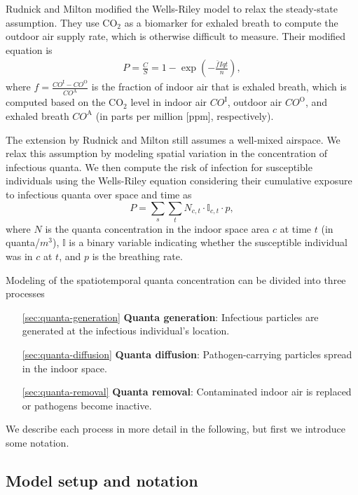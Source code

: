 \documentclass[fleqn,11pt]{wlscirep_supp}
\begin{document}
Rudnick and Milton\cite{Rudnick2003IndoorAir} modified the Wells-Riley model to relax the steady-state assumption. They use CO$_2$ as a biomarker for exhaled breath to compute the outdoor air supply rate, which is otherwise difficult to measure. Their modified equation is
\begin{align}
    P = \frac{C}{S} = 1 - \exp \left(-\frac{\bar{f}Iqt}{n}\right),
\end{align}
where $f = \frac{CO^{\text{I}}-CO^{\text{O}}}{CO^{\text{A}}}$ is the fraction of indoor air that is exhaled breath, which is computed based on the CO$_2$ level in indoor air $CO^{\text{I}}$, outdoor air $CO^{\text{O}}$, and exhaled breath $CO^{\text{A}}$ (in parts per million [ppm], respectively). 

The extension by Rudnick and Milton still assumes a well-mixed airspace. We relax this assumption by modeling spatial variation in the concentration of infectious quanta. We then compute the risk of infection for susceptible individuals using the Wells-Riley equation considering their cumulative exposure to infectious quanta over space and time as 
\begin{equation}\label{eq:spattemp-P}
    P = \sum_s \sum_t N_{c,t} \cdot \mathbb{I}_{c,t} \cdot p,
\end{equation}
where $N$ is the quanta concentration in the indoor space area $c$ at time $t$ (in quanta/$m^3$), $\mathbb{I}$ is a binary variable indicating whether the susceptible individual was in $c$ at $t$, and $p$ is the breathing rate. 

Modeling of the spatiotemporal quanta concentration can be divided into three processes
\begin{itemize}
    \item[\ref{sec:quanta-generation}] \textbf{Quanta generation}: Infectious particles are generated at the infectious individual's location. 
    \item[\ref{sec:quanta-diffusion}] \textbf{Quanta diffusion}: Pathogen-carrying particles spread in the indoor space. 
    \item[\ref{sec:quanta-removal}] \textbf{Quanta removal}: Contaminated indoor air is replaced or pathogens become inactive. 
\end{itemize}
We describe each process in more detail in the following, but first we introduce some notation. 

\subsection{Model setup and notation}
\end{document}
